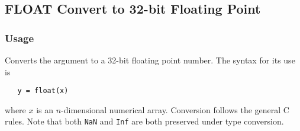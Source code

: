 %
%
%
\subsection{FLOAT Convert to 32-bit Floating Point}
\subsubsection{Usage}
Converts the argument to a 32-bit floating point number.  The syntax
for its use is
\begin{verbatim}
   y = float(x)
\end{verbatim}
where $x$ is an $n$-dimensional numerical array.  Conversion follows the general C rules.  Note that both \verb|NaN| and \verb|Inf| are both preserved under type conversion.
